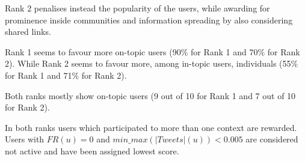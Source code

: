 Rank 2 penalises instead the popularity of the users, while awarding for prominence inside communities and information spreading by also considering shared links.

Rank 1 seems to favour more on-topic users (90\% for Rank 1 and 70\% for Rank 2). While Rank 2 seems to favour more, among in-topic users, individuals (55\% for Rank 1 and 71\% for Rank 2). 

Both ranks mostly show on-topic users (9 out of 10 for Rank 1 and 7 out of 10 for Rank 2).

In both ranks users which participated to more than one context are rewarded. Users with $\mathit{FR}(u) = 0$ and $\mathit{min\_max(\lvert Tweets \rvert(u)) < 0.005}$ are considered not active and have been assigned lowest score.
